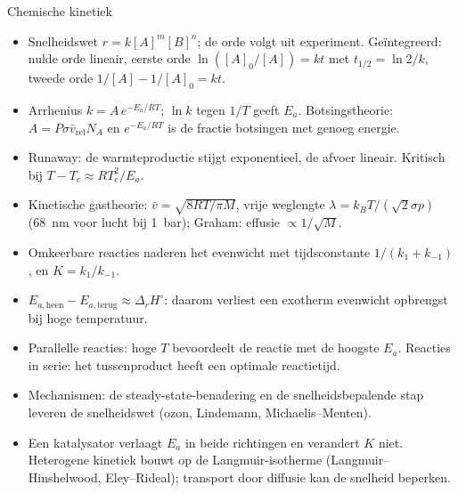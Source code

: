 \begin{samenvatting}{Chemische kinetiek}
\begin{itemize}
\item Snelheidswet $r = k[A]^m[B]^n$; de orde volgt uit experiment. Ge\"integreerd: nulde orde lineair, eerste orde $\ln([A]_0/[A]) = kt$ met $t_{1/2} = \ln2/k$, tweede orde $1/[A] - 1/[A]_0 = kt$.
\item Arrhenius $k = A\,e^{-E_a/RT}$; $\ln k$ tegen $1/T$ geeft $E_a$. Botsingstheorie: $A = P\sigma\bar v_\mathrm{rel}N_A$ en $e^{-E_a/RT}$ is de fractie botsingen met genoeg energie.
\item Runaway: de warmteproductie stijgt exponentieel, de afvoer lineair. Kritisch bij $T - T_c \approx RT_c^2/E_a$.
\item Kinetische gastheorie: $\bar v = \sqrt{8RT/\pi M}$, vrije weglengte $\lambda = k_BT/(\sqrt2\sigma p)$ (\SI{68}{\nano\metre} voor lucht bij \SI{1}{\bar}); Graham: effusie $\propto 1/\sqrt M$.
\item Omkeerbare reacties naderen het evenwicht met tijdsconstante $1/(k_1+k_{-1})$, en $K = k_1/k_{-1}$.
\item $E_{a,\mathrm{heen}} - E_{a,\mathrm{terug}} \approx \Delta_rH^\circ$: daarom verliest een exotherm evenwicht opbrengst bij hoge temperatuur.
\item Parallelle reacties: hoge $T$ bevoordeelt de reactie met de hoogste $E_a$. Reacties in serie: het tussenproduct heeft een optimale reactietijd.
\item Mechanismen: de steady-state-benadering en de snelheidsbepalende stap leveren de snelheidswet (ozon, Lindemann, Michaelis--Menten).
\item Een katalysator verlaagt $E_a$ in beide richtingen en verandert $K$ niet. Heterogene kinetiek bouwt op de Langmuir-isotherme (Langmuir--Hinshelwood, Eley--Rideal); transport door diffusie kan de snelheid beperken.
\end{itemize}
\end{samenvatting}


